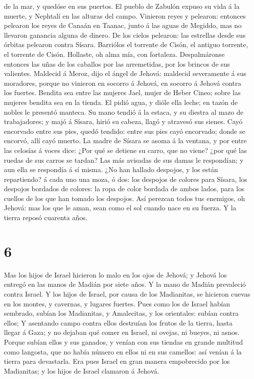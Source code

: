 de la mar, y quedóse en sus puertos.  El pueblo de Zabulón
expuso su vida á la muerte, y Nephtalí en las alturas del campo.
 Vinieron reyes y pelearon: entonces pelearon los reyes de
Canaán en Taanac, junto á las aguas de Megiddo, mas no llevaron ganancia
alguna de dinero.  De los cielos pelearon: las estrellas
desde sus órbitas pelearon contra Sísara.  Barriólos el
torrente de Cisón, el antiguo torrente, el torrente de Cisón. Hollaste,
oh alma mía, con fortaleza.  Despalmáronse entonces las
uñas de los caballos por las arremetidas, por los brincos de sus
valientes.  Maldecid á Meroz, dijo el ángel de Jehová:
maldecid severamente á sus moradores, porque no vinieron en socorro á
Jehová, en socorro á Jehová contra los fuertes.  Bendita
sea entre las mujeres Jael, mujer de Heber Cineo; sobre las mujeres
bendita sea en la tienda.  El pidió agua, y dióle ella
leche; en tazón de nobles le presentó manteca.  Su mano
tendió á la estaca, y su diestra al mazo de trabajadores; y majó á
Sísara, hirió su cabeza, llagó y atravesó sus sienes.  Cayó
encorvado entre sus pies, quedó tendido: entre sus pies cayó encorvado;
donde se encorvó, allí cayó muerto.  La madre de Sísara se
asoma á la ventana, y por entre las celosías á voces dice: ¿Por qué se
detiene su carro, que no viene? ¿por qué las ruedas de sus carros se
tardan?  Las más avisadas de sus damas le respondían; y aun
ella se respondía á sí misma.  ¿No han hallado despojos, y
los están repartiendo? á cada uno una moza, ó dos: los despojos de
colores para Sísara, los despojos bordados de colores: la ropa de color
bordada de ambos lados, para los cuellos de los que han tomado los
despojos.  Así perezcan todos tus enemigos, oh Jehová: mas
los que le aman, sean como el sol cuando nace en su fuerza. Y la tierra
reposó cuarenta años.

\hypertarget{section-5}{%
\section{6}\label{section-5}}

 Mas los hijos de Israel hicieron lo malo en los ojos de
Jehová; y Jehová los entregó en las manos de Madián por siete años.
 Y la mano de Madián prevaleció contra Israel. Y los hijos
de Israel, por causa de los Madianitas, se hicieron cuevas en los
montes, y cavernas, y lugares fuertes.  Pues como los de
Israel habían sembrado, subían los Madianitas, y Amalecitas, y los
orientales: subían contra ellos;  Y asentando campo contra
ellos destruían los frutos de la tierra, hasta llegar á Gaza; y no
dejaban qué comer en Israel, ni ovejas, ni bueyes, ni asnos.
 Porque subían ellos y sus ganados, y venían con sus tiendas
en grande multitud como langosta, que no había número en ellos ni en sus
camellos: así venían á la tierra para devastarla.  Era pues
Israel en gran manera empobrecido por los Madianitas; y los hijos de
Israel clamaron á Jehová.

